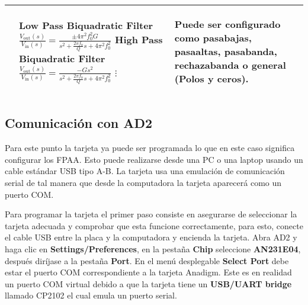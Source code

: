 \begin{table}[!ht]
\begin{tabular}{>{\centering\arraybackslash}m{3cm} >{\centering\arraybackslash}m{5cm} >{\centering\arraybackslash}m{5cm}}
	    &
	      \begin{scriptsize}
			 \textbf{Low Pass Biquadratic Filter} \linebreak
	      	 $\frac{V_{\mathrm{out}}(s)}{V_{\mathrm{in}}(s)} = \frac{\pm 4 \pi^{2} f_{0}^{2} G}{s^{2} + \frac{2 \pi f_{0}}{Q}s + 4 \pi^{2} f_{0}^{2}}$ \linebreak
	      	 \textbf{High Pass Biquadratic Filter} \linebreak
	      	 $\frac{V_{\mathrm{out}}(s)}{V_{\mathrm{in}}(s)} = \frac{-G s^{2}}{s^{2} + \frac{2 \pi f_{0}}{Q} s + 4 \pi^{2} f_{0}^{2}}$ \linebreak
	      	 $\vdots$
	      \end{scriptsize}
	    & 
	      \begin{itemize}[leftmargin=0cm,noitemsep]
	      \begin{scriptsize}
			\item[] Puede ser configurado como pasabajas, pasaaltas, pasabanda, rechazabanda o general (Polos y ceros).
	      \end{scriptsize}
	      \end{itemize}
	    \\ %
	    \hline
	  \end{tabular}
	\end{table}
	
		\subsection{Comunicación con AD2}\label{sec:comunicacion_con_AD2}

	Para este punto la tarjeta ya puede ser programada lo que en este caso significa configurar los FPAA. Esto puede realizarse desde una PC o una laptop usando un cable estándar USB tipo A-B. La tarjeta usa una emulación de comunicación serial de tal manera que desde la computadora la tarjeta aparecerá como un puerto COM.

	Para programar la tarjeta el primer paso consiste en asegurarse de seleccionar la tarjeta adecuada y comprobar que esta funcione correctamente, para esto, conecte el cable USB entre la placa y la computadora y encienda la tarjeta. Abra AD2 y haga clic en \textbf{Settings/Preferences}, en la pestaña \textbf{Chip} seleccione \textbf{AN231E04}, después diríjase a la pestaña \textbf{Port}. En el menú desplegable \textbf{Select Port} debe estar el puerto COM correspondiente a la tarjeta Anadigm. Este es en realidad un puerto COM virtual debido a que la tarjeta tiene un \textbf{USB/UART bridge} llamado CP2102 el cual emula un puerto serial. 

